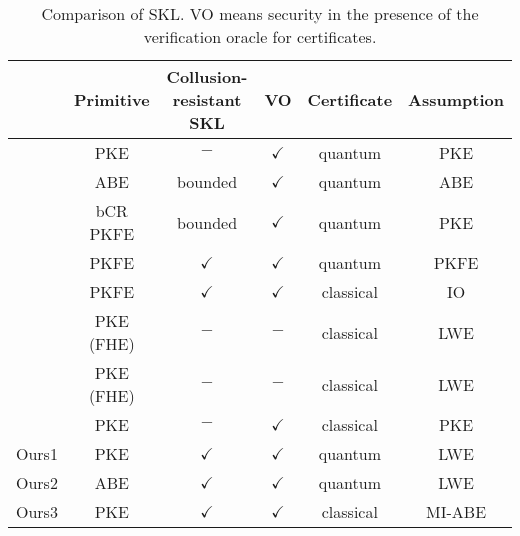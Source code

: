 \begin{table*}[!t]
\begin{center}
\begin{minipage}[c]{\textwidth}
\begin{center}
\begin{threeparttable}
\caption{{\scriptsize Comparison of SKL. VO means security in the presence of the verification oracle for certificates.
}
}
\label{tbl:comparison_PKE-SKL}
\begin{tabular}{rccccc}\toprule
 & Primitive & Collusion-resistant SKL & VO & Certificate & Assumption\\
\midrule
\cite{EC:AKNYY23} & PKE & $-$ & $\checkmark$ & quantum  & PKE\\
\cite{EC:AKNYY23} & ABE & bounded & $\checkmark$ & quantum  & ABE\\
 \cite{EC:AKNYY23} & bCR PKFE\tnote{a} & bounded & $\checkmark$ & quantum  & PKE \\
  \cite{EC:AKNYY23} & PKFE & $\checkmark$ & $\checkmark$ & quantum & PKFE\tnote{b} \\
\cite{EC:BGKMRR24} & PKFE\tnote{c} & $\checkmark$ & $\checkmark$\tnote{d} & classical  & IO \\
 \cite{TCC:AnaPorVai23,TCC:AnaHuHua24} & PKE (FHE) & $-$ &  $-$ & classical & LWE\\
 \cite{EPRINT:CGJL23} & PKE (FHE) & $-$ & $-$ & classical  & LWE\\
 \cite{myEPRINT:KitMorYam24} & PKE & $-$ & $\checkmark$\tnote{e}  & classical  & PKE\\
 \midrule
  Ours1 & PKE & \colorbox[rgb]{1,0.9,0}{$\checkmark$}&  \colorbox[rgb]{1,0.9,0}{$\checkmark$} & quantum  &\colorbox[rgb]{1,0.9,0}{LWE}\\
 Ours2 & ABE\tnote{c} & \colorbox[rgb]{1,0.9,0}{$\checkmark$}  & \colorbox[rgb]{1,0.9,0}{$\checkmark$} & quantum & \colorbox[rgb]{1,0.9,0}{LWE}\\
  Ours3 & PKE & \colorbox[rgb]{1,0.9,0}{$\checkmark$} & \colorbox[rgb]{1,0.9,0}{$\checkmark$} &  \colorbox[rgb]{1,0.9,0}{classical}  & MI-ABE\\

\end{tabular}
\end{threeparttable}
\end{center}
\end{minipage}
\end{center}
\end{table*}
